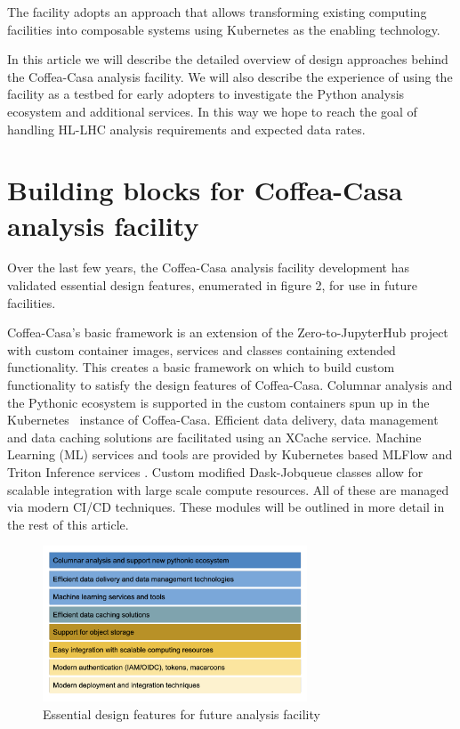 \documentclass{webofc}
\begin{document}
The facility adopts an approach that allows transforming existing computing facilities into composable systems using Kubernetes as the enabling technology.

In this article we will describe the detailed overview of design approaches behind the Coffea-Casa analysis facility. We will also describe the experience of using the facility as a testbed for early adopters to investigate the Python analysis ecosystem and additional services. In this way we hope to reach the goal of handling HL-LHC analysis requirements and expected data rates.
 
\section{Building blocks for Coffea-Casa analysis facility}

Over the last few years, the Coffea-Casa analysis facility development has validated essential design features, enumerated in figure 2, for use in future facilities.

Coffea-Casa's basic framework is an extension of the Zero-to-JupyterHub project\cite{z2h} with custom container images, services and classes containing extended functionality. This creates a basic framework on which to build custom functionality to satisfy the design features of Coffea-Casa.  Columnar analysis and the Pythonic ecosystem is supported in the custom containers spun up in the Kubernetes~\cite{brewer2015kubernetes} instance of Coffea-Casa.  Efficient data delivery, data management and data caching solutions are facilitated using an XCache\cite{XCache} service. Machine Learning (ML) services and tools are provided by Kubernetes based MLFlow \cite{mlflow} and Triton Inference services \cite{triton}. Custom modified Dask-Jobqueue \cite{dask-jq} classes allow for scalable integration with large scale compute resources. All of these are managed via modern CI/CD techniques. These modules will be outlined in more detail in the rest of this article.

\begin{figure}
\centering
\sidecaption
\includegraphics[width=0.7\textwidth]{bblocks.png}
\caption{Essential design features for future analysis facility}
\label{fig-2}       %
\end{figure}
\end{document}
